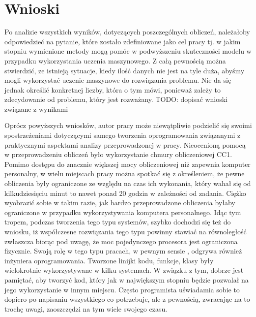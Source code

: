 
\section{Wnioski}\label{conclusion}
Po analizie wszystkich wyników, dotyczących poszczególnych obliczeń, należałoby odpowiedzieć na pytanie, które zostało zdefiniowane jako cel pracy tj. w jakim stopniu wymienione metody mogą pomóc w podwyższeniu skuteczności modelu w przypadku wykorzystania uczenia maszynowego. Z całą pewnością można stwierdzić, ze istnieją  sytuacje, kiedy ilość danych nie jest na tyle duża, abyśmy mogli wykorzystać uczenie maszynowe do rozwiązania problemu. Nie da się jednak określić konkretnej liczby, która o tym mówi, ponieważ zależy to zdecydowanie od problemu, który jest rozważany. TODO: dopisać wnioski związane z wynikami

Oprócz powyższych wniosków, autor pracy może niewątpliwie podzielić się swoimi spostrzeżeniami dotyczącymi samego tworzenia oprogramowania związanymi z praktycznymi aspektami analizy przeprowadzonej w pracy. Nieocenioną pomocą w przeprowadzeniu obliczeń było wykorzystanie chmury obliczeniowej CC1. Pomimo dostępu do znacznie większej mocy obliczeniowej niż zapewnia komputer personalny, w wielu miejscach pracy można spotkać się z określeniem, że pewne obliczenia były ograniczone ze względu na czas ich wykonania, który wahał się od kilkudziesięciu minut to nawet ponad 20 godzin w zależności od zadania. Ciężko wyobrazić sobie w takim razie, jak bardzo przeprowadzone obliczenia byłaby ograniczone w przypadku wykorzystywania komputera personalnego. Idąc tym tropem, podczas tworzenia tego typu systemów, szybko dochodzi się też do wniosku, iż współczesne rozwiązania tego typu powinny stawiać na równoległość zwłaszcza biorąc pod uwagę, że moc pojedynczego procesora jest ograniczona fizycznie. Swoją rolę w tego typu pracach, w pewnym sensie , odgrywa również inżyniera oprogramowania. Tworzone linijki kodu, funkcje, klasy były wielokrotnie wykorzystywane w kilku systemach. W związku z tym, dobrze jest pamiętać, aby tworzyć kod, który jak w największym stopniu będzie pozwalał na jego wykorzystanie w innym miejscu. Często programista uświadamia sobie to dopiero po napisaniu wszystkiego co potrzebuje, ale z pewnością, zwracając na to trochę uwagi, zaoszczędzi na tym wiele swojego czasu.
